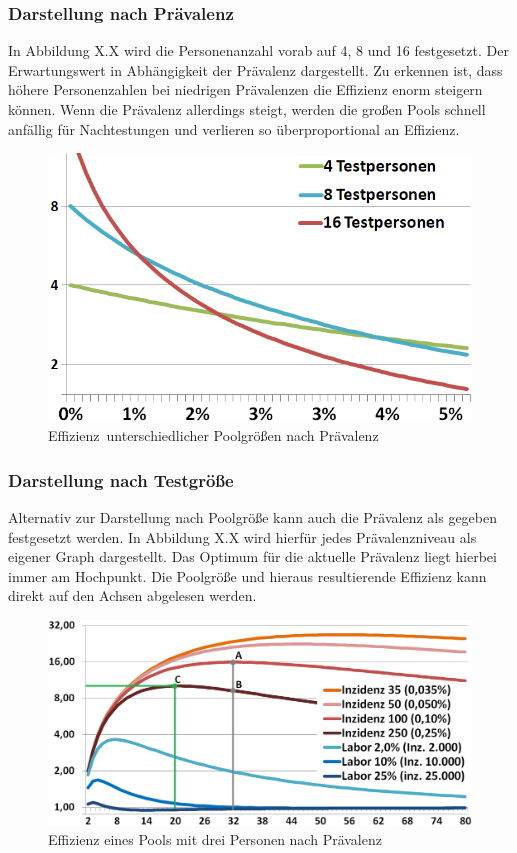 \subsubsection{Darstellung nach Prävalenz}
In Abbildung X.X wird die Personenanzahl vorab auf 4, 8 und 16 festgesetzt.
Der Erwartungswert in Abhängigkeit der Prävalenz dargestellt.
Zu erkennen ist, dass höhere Personenzahlen bei niedrigen Prävalenzen die Effizienz enorm steigern können.
Wenn die Prävalenz allerdings steigt, werden die großen Pools schnell anfällig für Nachtestungen und verlieren so überproportional an Effizienz.

\begin{figure}[h]
	\centering
	\includegraphics[width=1\textwidth]{img/PraevalenzZuTestgruppe}
	\caption{\mbox{Effizienz unterschiedlicher} \mbox{Poolgrößen} nach Prävalenz\footnotemark}
\end{figure}

\cleardoublepage

\subsubsection{Darstellung nach Testgröße}
Alternativ zur Darstellung nach Poolgröße kann auch die Prävalenz als gegeben festgesetzt werden.
In Abbildung X.X wird hierfür jedes Prävalenzniveau als eigener Graph dargestellt.
Das Optimum für die aktuelle Prävalenz liegt hierbei immer am Hochpunkt.
Die Poolgröße und hieraus resultierende Effizienz kann direkt auf den Achsen abgelesen werden.
\begin{figure}[h]
	\centering
	\includegraphics[width=1\textwidth]{img/EffizienzTestgruppePfeile}
	\caption{Effizienz eines Pools mit drei Personen nach Prävalenz\footnotemark}
\end{figure}

